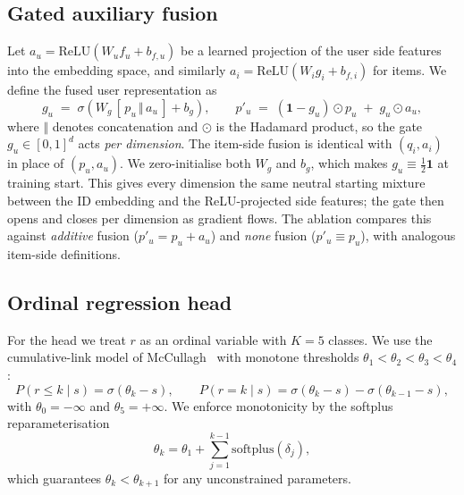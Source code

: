 \documentclass{article} %
\begin{document}
\subsection{Gated auxiliary fusion}
\label{sec:method:fusion}
Let $a_u=\mathrm{ReLU}(W_u f_u + b_{f,u})$ be a learned projection of the user
side features into the embedding space, and similarly $a_i=\mathrm{ReLU}(W_i g_i + b_{f,i})$
for items. We define the fused user representation as
\begin{equation}
\label{eq:gate}
g_u \;=\; \sigma\!\left(W_g \,[\,p_u \,\Vert\, a_u\,] + b_g\right),\qquad
p'_u \;=\; (\mathbf{1}-g_u)\odot p_u \;+\; g_u\odot a_u,
\end{equation}
where $\Vert$ denotes concatenation and $\odot$ is the Hadamard product, so the
gate $g_u\in[0,1]^d$ acts \emph{per dimension}. The item-side fusion is
identical with $(q_i,a_i)$ in place of $(p_u,a_u)$. We zero-initialise both
$W_g$ and $b_g$, which makes $g_u\equiv \tfrac12\mathbf{1}$ at training start.
This gives every dimension the same neutral starting mixture between the ID
embedding and the ReLU-projected side features; the gate then opens and closes
per dimension as gradient flows. The ablation compares this against
\emph{additive} fusion ($p'_u = p_u + a_u$) and \emph{none} fusion
($p'_u\equiv p_u$), with analogous item-side definitions.

\subsection{Ordinal regression head}
\label{sec:method:head}
For the head we treat $r$ as an ordinal variable with $K=5$ classes. We use the
cumulative-link model of McCullagh~\cite{mccullagh1980ordinal} with monotone
thresholds $\theta_1<\theta_2<\theta_3<\theta_4$:
\begin{equation}
\label{eq:cum}
P(r\le k\mid s) = \sigma(\theta_k - s),\qquad
P(r=k\mid s) = \sigma(\theta_k - s)-\sigma(\theta_{k-1} - s),
\end{equation}
with $\theta_0=-\infty$ and $\theta_5=+\infty$. We enforce monotonicity by the
softplus reparameterisation
\begin{equation}
\label{eq:softplus}
\theta_k=\theta_1+\sum_{j=1}^{k-1}\mathrm{softplus}(\delta_j),
\end{equation}
which guarantees $\theta_k<\theta_{k+1}$ for any unconstrained parameters.
\end{document}
